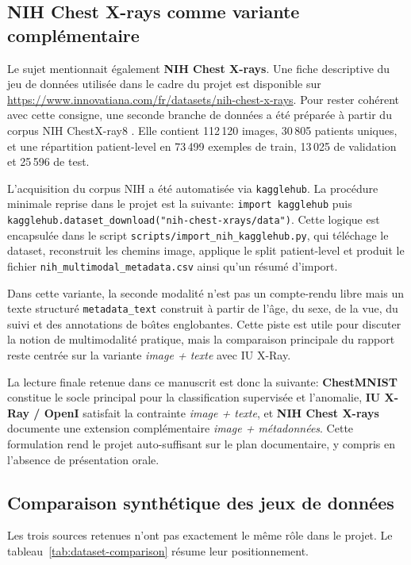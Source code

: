 \documentclass[11pt,a4paper]{article}
\begin{document}
\subsection{NIH Chest X-rays comme variante compl\'ementaire}
Le sujet mentionnait \'egalement \textbf{NIH Chest X-rays}. Une fiche descriptive du jeu de donn\'ees utilis\'ee dans le cadre du projet est disponible sur \url{https://www.innovatiana.com/fr/datasets/nih-chest-x-rays}. Pour rester coh\'erent avec cette consigne, une seconde branche de donn\'ees a \'et\'e pr\'epar\'ee \`a partir du corpus NIH ChestX-ray8 \cite{wang2017chestxray8}. Elle contient 112\,120 images, 30\,805 patients uniques, et une r\'epartition patient-level en 73\,499 exemples de train, 13\,025 de validation et 25\,596 de test.

L'acquisition du corpus NIH a \'et\'e automatis\'ee via \texttt{kagglehub}. La proc\'edure minimale reprise dans le projet est la suivante: \texttt{import kagglehub} puis \texttt{kagglehub.dataset\_download("nih-chest-xrays/data")}. Cette logique est encapsul\'ee dans le script \texttt{scripts/import\_nih\_kagglehub.py}, qui t\'el\'echage le dataset, reconstruit les chemins image, applique le split patient-level et produit le fichier \texttt{nih\_multimodal\_metadata.csv} ainsi qu'un r\'esum\'e d'import.

Dans cette variante, la seconde modalit\'e n'est pas un compte-rendu libre mais un texte structur\'e \texttt{metadata\_text} construit \`a partir de l'\^age, du sexe, de la vue, du suivi et des annotations de bo\^\i tes englobantes. Cette piste est utile pour discuter la notion de multimodalit\'e pratique, mais la comparaison principale du rapport reste centr\'ee sur la variante \emph{image + texte} avec IU X-Ray.

La lecture finale retenue dans ce manuscrit est donc la suivante: \textbf{ChestMNIST} constitue le socle principal pour la classification supervis\'ee et l'anomalie, \textbf{IU X-Ray / OpenI} satisfait la contrainte \emph{image + texte}, et \textbf{NIH Chest X-rays} documente une extension compl\'ementaire \emph{image + m\'etadonn\'ees}. Cette formulation rend le projet auto-suffisant sur le plan documentaire, y compris en l'absence de pr\'esentation orale.

\subsection{Comparaison synth\'etique des jeux de donn\'ees}
Les trois sources retenues n'ont pas exactement le m\^eme r\^ole dans le projet. Le tableau~\ref{tab:dataset-comparison} r\'esume leur positionnement.
\end{document}
